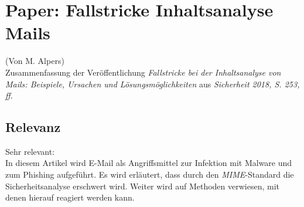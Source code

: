 \chapter{Paper: Fallstricke Inhaltsanalyse Mails}
(Von M. Alpers)\\

Zusammenfassung der Veröffentlichung \emph{Fallstricke bei der Inhaltsanalyse von Mails: Beispiele, Ursachen und Lösungsmöglichkeiten} aus \emph{Sicherheit 2018, S. 253, ff.}\\

\section{Relevanz}

Sehr relevant:\\

In diesem Artikel wird E-Mail als Angriffsmittel \glqq{}zur Infektion mit Malware und zum Phishing\grqq{} aufgeführt. Es wird erläutert, dass durch den \emph{MIME}-Standard die Sicherheitsanalyse erschwert wird. Weiter wird auf Methoden verwiesen, mit denen hierauf reagiert werden kann.